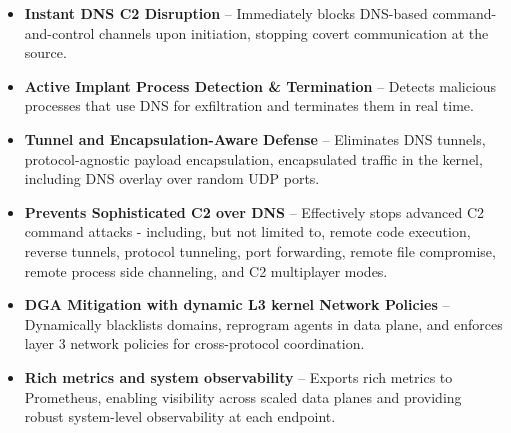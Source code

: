 \documentclass [11pt, proquest] {uwthesis}[2020/02/24]
\begin{document}

\begin{itemize}[nosep]
    \item \textbf{Instant DNS C2 Disruption} – Immediately blocks DNS-based command-and-control channels upon initiation, stopping covert communication at the source.

    \item \textbf{Active Implant Process Detection \& Termination} – Detects malicious processes that use DNS for exfiltration and terminates them in real time.

    \item \textbf{Tunnel and Encapsulation-Aware Defense} – Eliminates DNS tunnels, protocol-agnostic payload encapsulation, encapsulated traffic in the kernel, including DNS overlay over random UDP ports.

    \item \textbf{Prevents Sophisticated C2 over DNS} – Effectively stops advanced C2 command attacks - including, but not limited to, remote code execution, reverse tunnels, protocol tunneling, port forwarding, remote file compromise, remote process side channeling, and C2 multiplayer modes.

    \item \textbf{DGA Mitigation with dynamic L3 kernel Network Policies} – Dynamically blacklists  domains, reprogram agents in data plane, and enforces layer 3 network policies for cross-protocol coordination.

    \item \textbf{Rich metrics and system observability} – Exports rich metrics to Prometheus, enabling visibility across scaled data planes and providing robust system-level observability at each endpoint.


\end{itemize}
\end{document}
